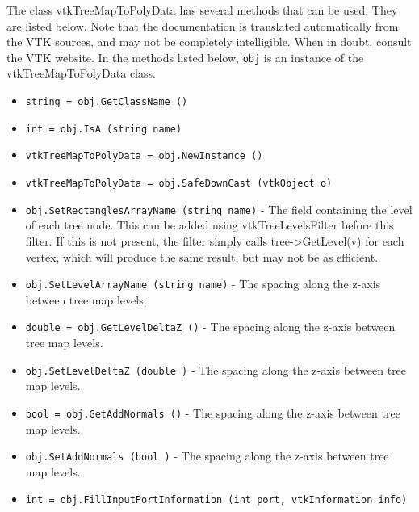 The class vtkTreeMapToPolyData has several methods that can be used.
  They are listed below.
Note that the documentation is translated automatically from the VTK sources,
and may not be completely intelligible.  When in doubt, consult the VTK website.
In the methods listed below, \verb|obj| is an instance of the vtkTreeMapToPolyData class.
\begin{itemize}
\item  \verb|string = obj.GetClassName ()|

\item  \verb|int = obj.IsA (string name)|

\item  \verb|vtkTreeMapToPolyData = obj.NewInstance ()|

\item  \verb|vtkTreeMapToPolyData = obj.SafeDownCast (vtkObject o)|

\item  \verb|obj.SetRectanglesArrayName (string name)| -  The field containing the level of each tree node.
 This can be added using vtkTreeLevelsFilter before this filter.
 If this is not present, the filter simply calls tree->GetLevel(v) for
 each vertex, which will produce the same result, but
 may not be as efficient.

\item  \verb|obj.SetLevelArrayName (string name)| -  The spacing along the z-axis between tree map levels.

\item  \verb|double = obj.GetLevelDeltaZ ()| -  The spacing along the z-axis between tree map levels.

\item  \verb|obj.SetLevelDeltaZ (double )| -  The spacing along the z-axis between tree map levels.

\item  \verb|bool = obj.GetAddNormals ()| -  The spacing along the z-axis between tree map levels.

\item  \verb|obj.SetAddNormals (bool )| -  The spacing along the z-axis between tree map levels.

\item  \verb|int = obj.FillInputPortInformation (int port, vtkInformation info)|

\end{itemize}
